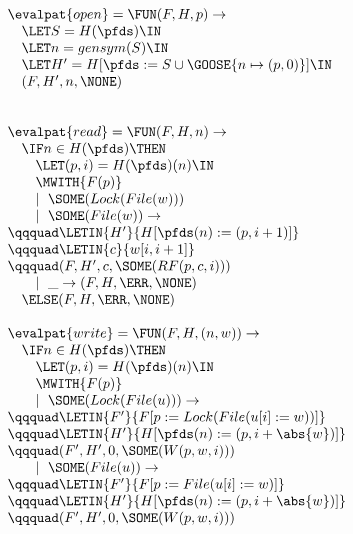 \begin{figure*}
\begin{minipage}[t]{0.5\linewidth}
\begin{displaymath}
\begin{array}{l}
\evalpat{open} = \FUN (F,H,p) \rightarrow \\
\quad \LET S = H(\pfds) \IN \\
\quad \LET n = gensym(S) \IN \\
\quad \LET H' = H[\pfds := S \cup \GOOSE{n \mapsto (p,0)}] \IN \\
\quad (F,H',n,\NONE) \\ \\
\\
\evalpat{read} = \FUN (F,H,n) \rightarrow \\
\quad \IF n \in H(\pfds) \THEN \\
\qquad \LET (p,i) = H(\pfds)(n) \IN \\
\qquad \MWITH{F(p)} \\
\qquad \mid~\SOME(Lock(File(w))) \\
\qquad \mid~\SOME(File(w)) \rightarrow \\
\qqquad \LETIN{H'}{H[\pfds(n) := (p,i+1)]} \\
\qqquad \LETIN{c}{w[i,i+1]} \\
\qqquad (F,H',c,\SOME(RF(p,c,i))) \\
\qquad \mid~\_  \rightarrow (F,H,\ERR,\NONE) \\
\quad \ELSE (F,H,\ERR,\NONE) \\
\\
\evalpat{write} = \FUN (F,H,(n,w)) \rightarrow \\
\quad \IF n \in H(\pfds) \THEN \\
\qquad \LET (p,i) = H(\pfds)(n) \IN \\
\qquad \MWITH{F(p)} \\
\qquad \mid~\SOME(Lock(File(u))) \rightarrow \\
\qqquad \LETIN{F'}{F[p := Lock(File(u[i] := w))]} \\
\qqquad \LETIN{H'}{H[\pfds(n) := (p,i + \abs{w})]} \\
\qqquad (F',H',0,\SOME(W(p,w,i))) \\
\qquad \mid~\SOME(File(u)) \rightarrow \\
\qqquad \LETIN{F'}{F[p := File(u[i] := w)]} \\
\qqquad \LETIN{H'}{H[\pfds(n) := (p,i + \abs{w})]} \\
\qqquad (F',H',0,\SOME(W(p,w,i))) \\

\end{array}
\end{displaymath}
\end{minipage}
\end{figure*}
